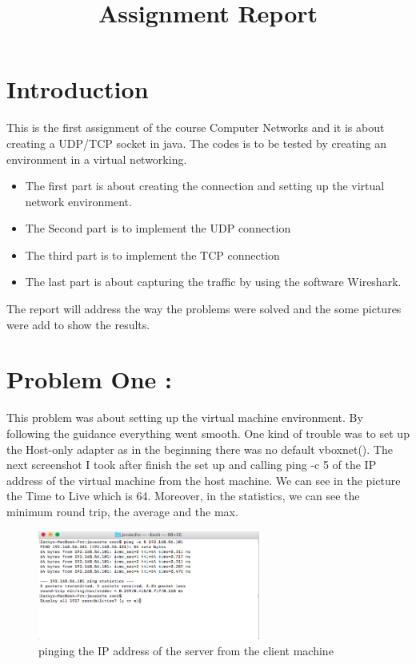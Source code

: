 \documentclass[a4paper,12pt]{article}
\begin{document}

%
%
	\title  { Assignment Report}
	\maketitle
	\section{Introduction}
This is the first assignment of the course Computer Networks and it is about creating a UDP/TCP socket in java. The codes is to be tested by creating an environment in a virtual networking.

\begin{itemize}
\item The first part is about creating the connection and setting up the virtual network environment.
\item The Second part is to implement the UDP connection
\item The third part is to implement the TCP connection
\item The last part is about capturing the traffic by using the software Wireshark.
\end{itemize}
The report will address the way the problems were solved and the some pictures were add to show the results. 



\section {Problem One :}

This problem was about setting up the virtual machine environment. By following the guidance everything went smooth. One kind of trouble was to set up the Host-only adapter as in the beginning there was no default vboxnet(). The next screenshot I took after finish the set up and calling ping -c 5 of the IP address of the virtual machine from the host machine. We can see in the picture the Time to Live which is 64. Moreover, in the statistics, we can see the minimum round trip, the average and the max.
\begin{figure}[h]
    \centering
    \includegraphics[width=0.65\textwidth]{ping}
    \caption{pinging the IP address of the server from the client machine}
    \label{fig:mesh1}
\end{figure}
\end{document}
